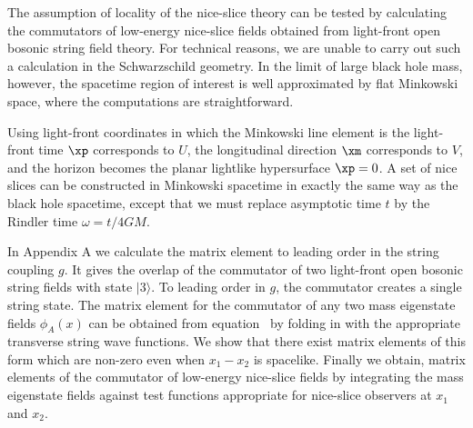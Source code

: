 The assumption of locality of the nice-slice
theory can be tested by calculating the commutators of low-energy
nice-slice fields
obtained from light-front open bosonic string field theory.  For
technical reasons, we are unable to carry out such a calculation in
the Schwarzschild geometry.  In the limit of large black hole mass,
however, the spacetime region of interest is well approximated by
flat Minkowski space, where the computations are straightforward.

Using light-front coordinates
\eqn{}
in which the Minkowski line element is
\eqn{}
the light-front time $\xp$ corresponds to $U$, the longitudinal
direction $\xm$ corresponds to $V$, and the horizon becomes the
planar lightlike hypersurface $\xp = 0$.  A set of nice slices can be
constructed in Minkowski spacetime in exactly the same way as the
black hole spacetime, except that we must replace asymptotic time $t$
by the Rindler time $\omega = t/4GM$.

In Appendix A we calculate the matrix element
\eqn{}
to leading order in the string coupling $g$.  It gives
the overlap of the commutator of two light-front open bosonic string
fields with state $|3\rangle$.
To leading order in $g$, the commutator creates a single string
state.
The matrix element
\eqn{}
for the commutator of any two mass eigenstate fields $\phi_A(x)$ can
be obtained from equation \goob\ by folding in with the appropriate
transverse string wave functions.
We show that there exist matrix elements of this form which are
non-zero
even when $x_1-x_2$ is spacelike.
Finally we obtain, matrix elements
of the commutator of low-energy nice-slice fields
\eqn{}
by integrating the mass eigenstate fields against test
functions appropriate for nice-slice observers at $x_1$ and $x_2$.

